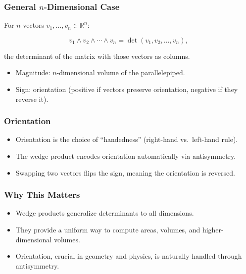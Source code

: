 \documentclass[
  letterpaper,
  DIV=11,
  numbers=noendperiod]{scrreprt}
\providecommand{\tightlist}{%
  \setlength{\itemsep}{0pt}\setlength{\parskip}{0pt}}
\begin{document}
\subsubsection{\texorpdfstring{General \(n\)-Dimensional
Case}{General n-Dimensional Case}}\label{general-n-dimensional-case}

For \(n\) vectors \(v_1, \dots, v_n \in \mathbb{R}^n\):

\[
v_1 \wedge v_2 \wedge \cdots \wedge v_n = \det(v_1, v_2, \dots, v_n),
\]

the determinant of the matrix with those vectors as columns.

\begin{itemize}
\tightlist
\item
  Magnitude: \(n\)-dimensional volume of the parallelepiped.
\item
  Sign: orientation (positive if vectors preserve orientation, negative
  if they reverse it).
\end{itemize}

\subsubsection{Orientation}\label{orientation}

\begin{itemize}
\tightlist
\item
  Orientation is the choice of ``handedness'' (right-hand vs.~left-hand
  rule).
\item
  The wedge product encodes orientation automatically via antisymmetry.
\item
  Swapping two vectors flips the sign, meaning the orientation is
  reversed.
\end{itemize}

\subsubsection{Why This Matters}\label{why-this-matters-17}

\begin{itemize}
\tightlist
\item
  Wedge products generalize determinants to all dimensions.
\item
  They provide a uniform way to compute areas, volumes, and
  higher-dimensional volumes.
\item
  Orientation, crucial in geometry and physics, is naturally handled
  through antisymmetry.
\end{itemize}
\end{document}
